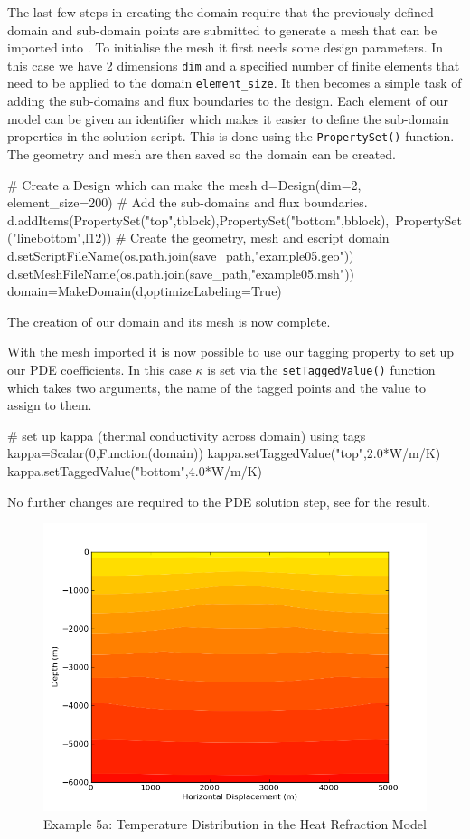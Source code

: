 The last few steps in creating the domain require that the previously defined
domain and sub-domain points are submitted to generate a mesh that can be
imported into \esc.
To initialise the mesh it first needs some design parameters. In this case we
have 2 dimensions \verb|dim| and a specified number of finite elements that need
to be applied to the domain \verb|element_size|. It then becomes a simple task
of adding the sub-domains and flux boundaries to the design. Each element of our
model can be given an identifier which makes it easier to define the sub-domain
properties in the solution script. This is done using the 
\verb|PropertySet()| function. The geometry and mesh are then saved so the
\esc domain can be created.
\begin{python}
# Create a Design which can make the mesh
d=Design(dim=2, element_size=200)
# Add the sub-domains and flux boundaries.
d.addItems(PropertySet("top",tblock),PropertySet("bottom",bblock),\
                   PropertySet("linebottom",l12))
# Create the geometry, mesh and escript domain
d.setScriptFileName(os.path.join(save_path,"example05.geo"))
d.setMeshFileName(os.path.join(save_path,"example05.msh"))
domain=MakeDomain(d,optimizeLabeling=True)
\end{python}
The creation of our domain and its mesh is now complete.

With the mesh imported it is now possible to use our tagging property to set up
our PDE coefficients. In this case $\kappa$ is set via the
\verb|setTaggedValue()| function which takes two arguments, the name of the
tagged points and the value to assign to them. 
\begin{python}
# set up kappa (thermal conductivity across domain) using tags
kappa=Scalar(0,Function(domain))
kappa.setTaggedValue("top",2.0*W/m/K)
kappa.setTaggedValue("bottom",4.0*W/m/K)
\end{python}
No further changes are required to the PDE solution step, see
 for the result. 

\begin{figure}[ht]
\centerline{\includegraphics[width=4.in]{figures/heatrefraction}}
\caption{Example 5a: Temperature Distribution in the Heat Refraction Model}
\label{fig:anticlinetemp}
\end{figure}
\clearpage

